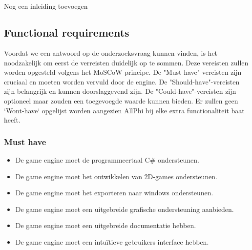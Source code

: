 
\chapter{}%
\label{ch:requirements-analyse}

Nog een inleiding toevoegen

\section{Functional requirements}
Voordat we een antwoord op de onderzoeksvraag kunnen vinden, is het noodzakelijk om eerst de verreisten duidelijk op te sommen. Deze vereisten zullen worden opgesteld volgens het MoSCoW-principe. De "Must-have"-vereisten zijn cruciaal en moeten worden vervuld door de engine. De "Should-have"-vereisten zijn belangrijk en kunnen doorslaggevend zijn. De "Could-have"-vereisten zijn optioneel maar zouden een toegevoegde waarde kunnen bieden. Er zullen geen `Wont-have` opgelijst worden aangezien AllPhi bij elke extra functionaliteit baat heeft.
\subsection{Must have}
\begin{itemize}
    \item De game engine moet de programmeertaal C\# ondersteunen.
    \item De game engine moet het ontwikkelen van 2D-games ondersteunen.
    \item De game engine moet het exporteren naar windows ondersteunen.
    \item De game engine moet een uitgebreide grafische ondersteuning aanbieden.
    \item De game engine moet een uitgebreide documentatie hebben.
    \item De game engine moet een intuïtieve gebruikers interface hebben.
\end{itemize}

